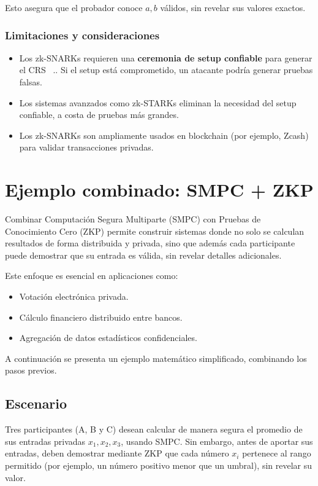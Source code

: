 \documentclass{article}
\begin{document}
Esto asegura que el probador conoce \( a, b \) válidos, sin revelar sus valores exactos.

\subsubsection{Limitaciones y consideraciones}

\begin{itemize}
    \item Los zk-SNARKs requieren una \textbf{ceremonia de setup confiable} para generar el CRS ~\cite{ben2014}.. Si el setup está comprometido, un atacante podría generar pruebas falsas.
    \item Los sistemas avanzados como zk-STARKs eliminan la necesidad del setup confiable, a costa de pruebas más grandes.
    \item Los zk-SNARKs son ampliamente usados en blockchain (por ejemplo, Zcash) para validar transacciones privadas.
\end{itemize}


\section{Ejemplo combinado: SMPC + ZKP}

Combinar Computación Segura Multiparte (SMPC) con Pruebas de Conocimiento Cero (ZKP) permite construir sistemas donde no solo se calculan resultados de forma distribuida y privada, sino que además cada participante puede demostrar que su entrada es válida, sin revelar detalles adicionales.

Este enfoque es esencial en aplicaciones como:
\begin{itemize}
    \item Votación electrónica privada.
    \item Cálculo financiero distribuido entre bancos.
    \item Agregación de datos estadísticos confidenciales.
\end{itemize}

A continuación se presenta un ejemplo matemático simplificado, combinando los pasos previos.

\subsection{Escenario}

Tres participantes (A, B y C) desean calcular de manera segura el promedio de sus entradas privadas \( x_1, x_2, x_3 \), usando SMPC. Sin embargo, antes de aportar sus entradas, deben demostrar mediante ZKP que cada número \( x_i \) pertenece al rango permitido (por ejemplo, un número positivo menor que un umbral), sin revelar su valor.
\end{document}
